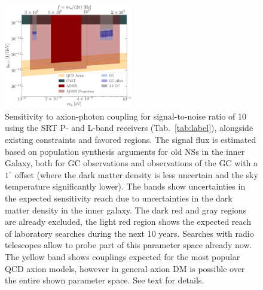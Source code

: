 \documentclass[a4paper, 11pt]{article}
\begin{document}
\begin{figure}
   \centering
  \includegraphics[width=0.50\textwidth]{SRT_GC.pdf}
   \caption{Sensitivity to axion-photon coupling for signal-to-noise ratio of 10 using the SRT P- and L-band receivers (Tab.~\ref{tab:label}), alongside existing constraints and favored regions.  The signal flux is estimated based on population synthesis arguments for old NSs in the inner Galaxy, both for GC observations and observations of the GC with a $1^\circ$ offset (where the dark matter density is less uncertain and the sky temperature significantly lower).  The bands show uncertainties in the expected sensitivity reach due to uncertainties in the dark matter density in the inner galaxy.  The dark red and gray regions are already excluded, the light red region shows the expected reach of laboratory searches during the next 10 years.  Searches with radio telescopes allow to probe part of this parameter space already now.  The yellow band shows couplings expected for the most popular QCD axion models, however in general axion DM is possible over the entire shown parameter space.  See text for details.
}
   \label{fig: sensitivity}
   \end{figure}
   
\end{document}
